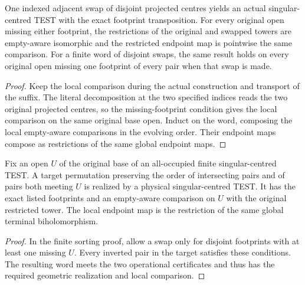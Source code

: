 \begin{corollary}
\label{hir:g8-indexed-disjoint-swap-readback}
\leanok
One indexed adjacent swap of disjoint projected centres yields an
actual singular-centred TEST with the exact footprint transposition.
For every original open missing either footprint, the restrictions
of the original and swapped towers are empty-aware isomorphic and
the restricted endpoint map is pointwise the same comparison.
For a finite word of disjoint swaps, the same result holds on every
original open missing one footprint of every pair when that swap is
made.
\end{corollary}
\begin{proof}
Keep the local comparison during the actual construction and
transport of the suffix. The literal decomposition at the two
specified indices reads the two original projected centres, so the
missing-footprint condition gives the local comparison on the same
original base open. Induct on the word, composing the local
empty-aware comparisons in the evolving order. Their endpoint maps
compose as restrictions of the same global endpoint maps.
\end{proof}

\begin{corollary}
\label{hir:g8-visible-order-realization}
\leanok
Fix an open $U$ of the original base of an all-occupied finite
singular-centred TEST. A target permutation preserving the order of
intersecting pairs and of pairs both meeting $U$ is realized by a
physical singular-centred TEST. It has the exact listed footprints
and an empty-aware comparison on $U$ with the original restricted
tower. The local endpoint map is the restriction of the same
global terminal biholomorphism.
\end{corollary}
\begin{proof}
In the finite sorting proof, allow a swap only for disjoint
footprints with at least one missing $U$. Every inverted pair in
the target satisfies these conditions. The resulting word meets the
two operational certificates and thus has the required geometric
realization and local comparison.
\end{proof}

